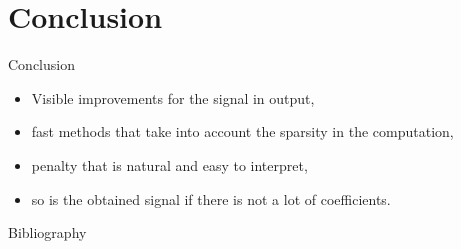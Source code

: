 \documentclass[10pt,aspectratio=43]{beamer}
\begin{document}
\section{Conclusion}
\begin{frame}{Conclusion}
    \begin{itemize}
      \setlength\itemsep{1em}
        \item<1-> Visible improvements for the signal in output,
        \item<1-> fast methods that take into account the sparsity in the computation,
        \item<2-> \color{red} penalty that is natural and easy to interpret,
        \item<2-> \color{red}so is the obtained signal if there is not a lot of coefficients.\color{black}
    \end{itemize}
\end{frame}

\begin{frame}{Bibliography}
\nocite{*}
\printbibliography[heading=none]
\end{frame}

\begin{frame}
\end{frame}
\end{document}
